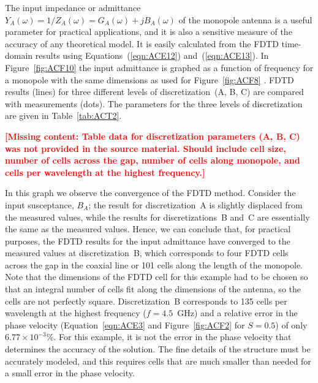 The input impedance or admittance $Y_A(\omega) = 1/Z_A(\omega) = G_A(\omega) + jB_A(\omega)$ of the monopole antenna is a useful parameter for practical applications, and it is also a sensitive measure of the accuracy of any theoretical model.  It is easily calculated from the FDTD time-domain results using Equations~(\ref{eqn:ACE12}) and~(\ref{eqn:ACE13}).  In Figure~\ref{fig:ACF10} the input admittance is graphed as a function of frequency for a monopole with the same dimensions as used for Figure~\ref{fig:ACF8} \cite{Smith2003}.  FDTD results (lines) for three different levels of discretization~(A, B, C) are compared with measurements (dots).  The parameters for the three levels of discretization are given in Table~\ref{tab:ACT2}.

\begin{table}
\caption[FDTD discretization for cylindrical monopole]{FDTD Discretization Parameters for the Cylindrical Monopole Antenna.}
\label{tab:ACT2}
\textcolor{red}{\textbf{[Missing content: Table data for discretization parameters (A, B, C) was not provided in the source material.  Should include cell size, number of cells across the gap, number of cells along monopole, and cells per wavelength at the highest frequency.]}}
\end{table}

In this graph we observe the convergence of the FDTD method.  Consider the input susceptance, $B_A$; the result for discretization~A is slightly displaced from the measured values, while the results for discretizations~B and~C are essentially the same as the measured values.  Hence, we can conclude that, for practical purposes, the FDTD results for the input admittance have converged to the measured values at discretization~B, which corresponds to four FDTD cells across the gap in the coaxial line or 101 cells along the length of the monopole.  Note that the dimensions of the FDTD cell for this example had to be chosen so that an integral number of cells fit along the dimensions of the antenna, so the cells are not perfectly square.  Discretization~B corresponds to 135 cells per wavelength at the highest frequency ($f=4.5$~GHz) and a relative error in the phase velocity (Equation~\ref{eqn:ACE3} and Figure~\ref{fig:ACF2} for $S=0.5$) of only $6.77\times10^{-3}\%$.  For this example, it is not the error in the phase velocity that determines the accuracy of the solution.  The fine details of the structure must be accurately modeled, and this requires cells that are much smaller than needed for a small error in the phase velocity.


